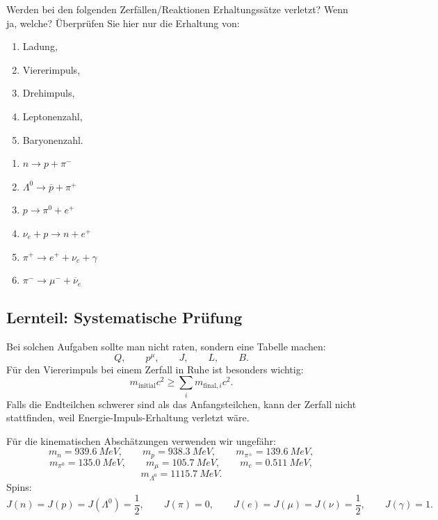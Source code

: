 \documentclass[11pt,a4paper]{scrartcl}
\theoremstyle{definition}
\theoremstyle{plain}
\theoremstyle{remark}
\begin{document}
\begin{taskbox}
Werden bei den folgenden Zerfällen/Reaktionen Erhaltungssätze verletzt? Wenn ja, welche? Überprüfen Sie hier nur die Erhaltung von:
\begin{enumerate}
    \item Ladung,
    \item Viererimpuls,
    \item Drehimpuls,
    \item Leptonenzahl,
    \item Baryonenzahl.
\end{enumerate}

\begin{enumerate}[label=(\alph*)]
    \item $n\to p+\pi^-$
    \item $\Lambda^0\to\overline p+\pi^+$
    \item $p\to\pi^0+e^+$
    \item $\nu_e+p\to n+e^+$
    \item $\pi^+\to e^+ + \nu_e+\gamma$
    \item $\pi^-\to\mu^-+\overline\nu_e$
\end{enumerate}
\end{taskbox}

\subsection{Lernteil: Systematische Pr\"ufung}

\begin{learningbox}
Bei solchen Aufgaben sollte man nicht raten, sondern eine Tabelle machen:
\[
    Q,\qquad p^\mu,\qquad J,\qquad L,\qquad B.
\]
Für den Viererimpuls bei einem Zerfall in Ruhe ist besonders wichtig:
\[
    m_{\mathrm{initial}}c^2
    \ge
    \sum_i m_{\mathrm{final},i}c^2.
\]
Falls die Endteilchen schwerer sind als das Anfangsteilchen, kann der Zerfall nicht stattfinden, weil Energie-Impuls-Erhaltung verletzt wäre.
\end{learningbox}

\begin{notebox}[title=Benutzte Massen und Quantenzahlen]
Für die kinematischen Abschätzungen verwenden wir ungefähr:
\[
    m_n=\SI{939.6}{MeV},
    \qquad
    m_p=\SI{938.3}{MeV},
    \qquad
    m_{\pi^\pm}=\SI{139.6}{MeV},
\]
\[
    m_{\pi^0}=\SI{135.0}{MeV},
    \qquad
    m_\mu=\SI{105.7}{MeV},
    \qquad
    m_e=\SI{0.511}{MeV},
\]
\[
    m_{\Lambda^0}=\SI{1115.7}{MeV}.
\]
Spins:
\[
    J(n)=J(p)=J(\Lambda^0)=\frac12,
    \qquad
    J(\pi)=0,
    \qquad
    J(e)=J(\mu)=J(\nu)=\frac12,
    \qquad
    J(\gamma)=1.
\]
\end{notebox}
\end{document}
